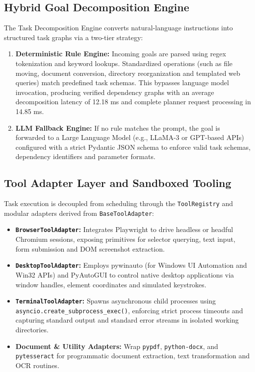 \documentclass[conference]{IEEEtran}
\begin{document}
\subsection{Hybrid Goal Decomposition Engine}
The Task Decomposition Engine converts natural-language instructions into structured task graphs via a two-tier strategy:
\begin{enumerate}
    \item \textbf{Deterministic Rule Engine:} Incoming goals are parsed using regex tokenization and keyword lookups. Standardized operations (such as file moving, document conversion, directory reorganization and templated web queries) match predefined task schemas. This bypasses language model invocation, producing verified dependency graphs with an average decomposition latency of 12.18 ms and complete planner request processing in 14.85 ms.
    \item \textbf{LLM Fallback Engine:} If no rule matches the prompt, the goal is forwarded to a Large Language Model (e.g., LLaMA-3 or GPT-based APIs) configured with a strict Pydantic JSON schema to enforce valid task schemas, dependency identifiers and parameter formats.
\end{enumerate}

\subsection{Tool Adapter Layer and Sandboxed Tooling}
Task execution is decoupled from scheduling through the \texttt{ToolRegistry} and modular adapters derived from \texttt{BaseToolAdapter}:
\begin{itemize}
    \item \textbf{\texttt{BrowserToolAdapter}:} Integrates Playwright to drive headless or headful Chromium sessions, exposing primitives for selector querying, text input, form submission and DOM screenshot extraction.
    \item \textbf{\texttt{DesktopToolAdapter}:} Employs pywinauto (for Windows UI Automation and Win32 APIs) and PyAutoGUI to control native desktop applications via window handles, element coordinates and simulated keystrokes.
    \item \textbf{\texttt{TerminalToolAdapter}:} Spawns asynchronous child processes using \texttt{asyncio.create\_subprocess\_exec()}, enforcing strict process timeouts and capturing standard output and standard error streams in isolated working directories.
    \item \textbf{Document \& Utility Adapters:} Wrap \texttt{pypdf}, \texttt{python-docx}, and \texttt{pytesseract} for programmatic document extraction, text transformation and OCR routines.
\end{itemize}
\end{document}
